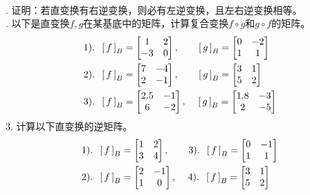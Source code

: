 \documentclass[12pt,UTF8]{ctexbook}
\begin{document}
\begin{xt}
    \mbox{} \\
    . 证明：若直变换有右逆变换，则必有左逆变换，且左右逆变换相等。\\
    . 以下是直变换$f,g$在某基底中的矩阵，计算复合变换$f\circ g$和$g\circ f$的矩阵。
    \begin{align*}
        1). \;\;\bmat{f}[B] &= 
        \begin{bmatrix}
            1 & 2 \\ -3 & 0
        \end{bmatrix},\qquad
        \bmat{g}[B] = 
        \begin{bmatrix}
            0 & -2 \\ 1 & 1
        \end{bmatrix} \\
        2). \;\;\bmat{f}[B] &= 
        \begin{bmatrix}
            7 & -4 \\ 2 & -1
        \end{bmatrix},\qquad
        \bmat{g}[B] = 
        \begin{bmatrix}
            3 & 1 \\ 5 & 2
        \end{bmatrix} \\
        3). \;\;\bmat{f}[B] &= 
        \begin{bmatrix}
            2.5 & -1 \\ 6 & -2
        \end{bmatrix},\quad\,
        \bmat{g}[B] = 
        \begin{bmatrix}
            1.8 & -3 \\ 2 & -5
        \end{bmatrix}
    \end{align*}
    3. 计算以下直变换的逆矩阵。
    \begin{align*}
        1). \;\;\bmat{f}[B] &= 
        \begin{bmatrix}
            1 & 2 \\ 3 & 4
        \end{bmatrix},\qquad
        3).\;\;\bmat{f}[B] = 
        \begin{bmatrix}
            0 & -1 \\ 1 & 1
        \end{bmatrix} \\
        2). \;\;\bmat{f}[B] &= 
        \begin{bmatrix}
            2 & -1 \\ 1 & 0
        \end{bmatrix},\quad\,
        4).\;\;\bmat{f}[B] = 
        \begin{bmatrix}
            3 & 1 \\ 5 & 2
        \end{bmatrix} 
    \end{align*}

\end{xt}
\end{document}
